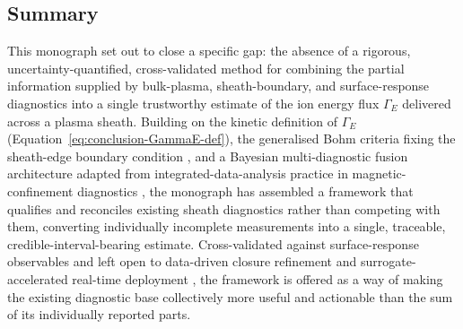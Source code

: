 \subsection{Summary}
\label{ssec:conclusion-summary}

This monograph set out to close a specific gap: the absence of a rigorous, uncertainty-quantified, cross-validated method for combining the partial information supplied by bulk-plasma, sheath-boundary, and surface-response diagnostics into a single trustworthy estimate of the ion energy flux $\Gamma_{E}$ delivered across a plasma sheath. Building on the kinetic definition of $\Gamma_{E}$ (Equation~\ref{eq:conclusion-GammaE-def}), the generalised Bohm criteria fixing the sheath-edge boundary condition \cite{ref0001,ref0013,ref0017}, and a Bayesian multi-diagnostic fusion architecture adapted from integrated-data-analysis practice in magnetic-confinement diagnostics \cite{ref0706,ref0707,ref0709,ref0711,ref0727}, the monograph has assembled a framework that qualifies and reconciles existing sheath diagnostics rather than competing with them, converting individually incomplete measurements into a single, traceable, credible-interval-bearing estimate. Cross-validated against surface-response observables \cite{ref0093,ref0074,ref0075,ref0105} and left open to data-driven closure refinement \cite{ref0101} and surrogate-accelerated real-time deployment \cite{ref0728,ref0731}, the framework is offered as a way of making the existing diagnostic base collectively more useful and actionable than the sum of its individually reported parts.
